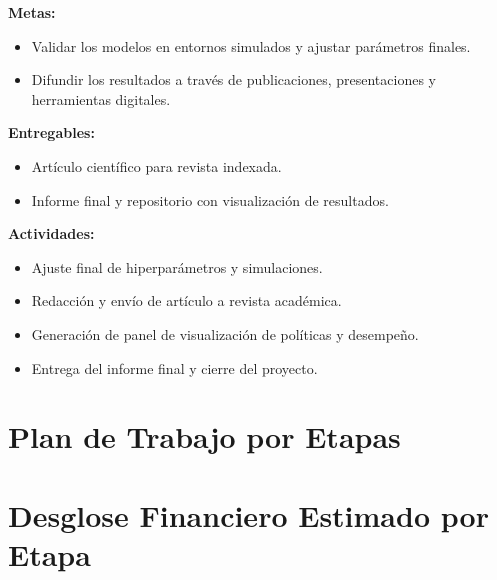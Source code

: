 \documentclass[12pt]{article}
\begin{document}
\textbf{Metas:}
\begin{itemize}
  \item Validar los modelos en entornos simulados y ajustar parámetros finales.
  \item Difundir los resultados a través de publicaciones, presentaciones y herramientas digitales.
\end{itemize}

\textbf{Entregables:}
\begin{itemize}
  \item Artículo científico para revista indexada.
  \item Informe final y repositorio con visualización de resultados.
\end{itemize}

\textbf{Actividades:}
\begin{itemize}
  \item Ajuste final de hiperparámetros y simulaciones.
  \item Redacción y envío de artículo a revista académica.
  \item Generación de panel de visualización de políticas y desempeño.
  \item Entrega del informe final y cierre del proyecto.
\end{itemize}


\section{Plan de Trabajo por Etapas}


\section{Desglose Financiero Estimado por Etapa}
\end{document}
